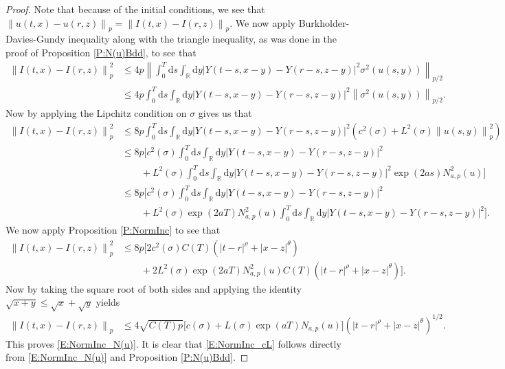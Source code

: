 \documentclass[a4paper,11pt]{article}
\numberwithin{equation}{section}
\theoremstyle{plain}
\theoremstyle{definition}
\newcommand{\ud}{\ensuremath{\mathrm{d} }}
\newcommand{\Norm}[1]{\left\|  #1   \right\|}
\newcommand{\R}{\mathbb{R}}
\numberwithin{NQ}{section}
\numberwithin{LQ}{section}
\numberwithin{ZQ}{section}
\begin{document}
\begin{proof}
Note that because of the initial conditions, we see that $\Norm{u(t,x) - u(r,z)}_p = \Norm{I(t,x) - I(r,z)}_p$. We now apply Burkholder-Davies-Gundy inequality along with the triangle inequality, as was done in the proof of Proposition \ref{P:N(u)Bdd},  to see that
	\begin{align*}
		\Norm{I(t,x) - I(r,z)}_p^2 &\le 4p \Norm{ \int_0^T \ud s \int_{\R} \ud y \left| Y(t-s,x-y) - Y(r-s,z-y) \right|^2\sigma^2(u(s,y)) }_{p/2} \\
		&\le 4p \int_0^T \ud s \int_{\R} \ud y \left| Y(t-s,x-y) - Y(r-s,z-y) \right|^2  \Norm{\sigma^2(u(s,y)) }_{p/2}.
	\end{align*} 
Now by applying the Lipchitz condition on $\sigma$ gives us that 
	\begin{align*}
		\Norm{I(t,x) - I(r,z)}_p^2 &\le 8p \int_0^T \ud s \int_{\R} \ud y \left| Y(t-s,x-y) - Y(r-s,z-y) \right|^2 \left( c^2(\sigma) + L^2(\sigma)\Norm{u(s,y)}_{p}^2\right) \\
		&\le 8p\Bigg[ c^2(\sigma)   \int_0^T \ud s \int_{\R} \ud y \left| Y(t-s,x-y) - Y(r-s,z-y) \right|^2 \\
		& \qquad+ L^2(\sigma) \int_0^T \ud s \int_{\R} \ud y \left| Y(t-s,x-y) - Y(r-s,z-y) \right|^2 \exp\left(2as\right)N_{a,p}^2(u)  \Bigg] \\
		&\le 8p\Bigg[ c^2(\sigma)   \int_0^T \ud s \int_{\R} \ud y \left| Y(t-s,x-y) - Y(r-s,z-y) \right|^2 \\
		& \qquad+ L^2(\sigma) \exp\left(2aT \right)N_{a,p}^2(u)  \int_0^T \ud s \int_{\R} \ud y \left| Y(t-s,x-y) - Y(r-s,z-y) \right|^2  \Bigg]. 
	\end{align*}
We now apply Proposition \ref{P:NormInc} to see that 
	\begin{align*}
	\Norm{I(t,x) - I(r,z)}_p^2 &\le 8p \bigg[ 2c^2(\sigma)C(T)\left(|t-r|^{\rho} + |x-z|^{\theta}\right)\\ 
	& \qquad + 2 L^2(\sigma) \exp\left(2aT \right)N_{a,p}^2(u) C(T) \left(|t-r|^{\rho} + |x-z|^{\theta}\right) \bigg]. 
	\end{align*}
Now by taking the square root of both sides and applying the identity $\sqrt{x+y} \le \sqrt{x} + \sqrt{y}$ yields
	\begin{align*}
	\Norm{I(t,x) - I(r,z)}_p &\le 4\sqrt{C(T)p} \Big[ c(\sigma) + L(\sigma) \exp\left(aT \right)N_{a,p}(u) \Big]\left(|t-r|^{\rho} + |x-z|^{\theta}\right)^{1/2}. 
	\end{align*}
This proves \eqref{E:NormInc_N(u)}. It is clear that \eqref{E:NormInc_cL} follows directly from \eqref{E:NormInc_N(u)} and Proposition \ref{P:N(u)Bdd}. 
\end{proof}
\end{document}
